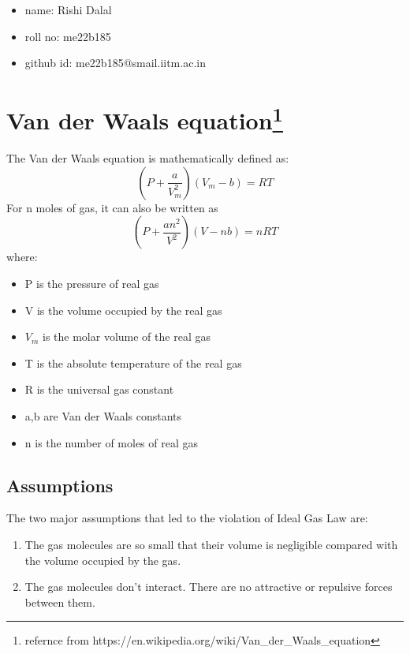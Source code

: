 




\begin{itemize}
    \item name: Rishi Dalal
    \item roll no: me22b185
    \item github id: me22b185@smail.iitm.ac.in
\end{itemize}

\section*{Van der Waals equation\footnote{refernce from https://en.wikipedia.org/wiki/Van\_der\_Waals\_equation}}
The Van der Waals  equation is mathematically defined as:
$$\left(P+\frac{a}{V_m^2}\right)\left(V_m-b\right)=RT$$
For n moles of gas, it can also be written as
$$\left(P+\frac{an^2}{V^2}\right)\left(V-nb\right)=nRT$$
where:
\begin{itemize}
    \item P is the pressure of real gas
    \item V is the volume occupied by the real gas
    \item $V_m$ is the molar volume of the real gas
    \item T is the absolute temperature of the real gas
    \item R is the universal gas constant
    \item a,b are Van der Waals constants
    \item n is the number of moles of real gas
\end{itemize}
\subsection*{Assumptions}
 The two major assumptions that led to the violation of Ideal Gas Law are:
\begin{enumerate}
    \item The gas molecules are so small that their volume is negligible compared with the volume occupied by the gas.
    \item The gas molecules don't interact. There are no attractive or repulsive forces between them.
\end{enumerate}
